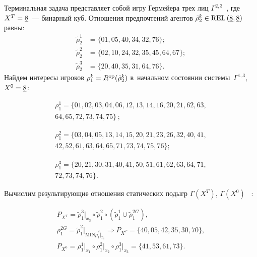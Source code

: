 \begin{multicols}{2}
    \vspace*{-3pt}
    
    \noindent
Терминальная задача представляет собой игру Гермейера трех лиц 
$\Gamma^{2,3}$~\cite{1-vas, 5-vas}, где $X^T\hm=\underline{8}$~--- бинарный куб. 
Отношения предпочтений агентов $\tilde{\rho}_2^k \hm\in \mathrm{REL}\,(\underline{8},\underline{8})$ равны:
\begin{align*}
\tilde{\rho}_2^1 &=\{ 01, 05, 40, 34, 32, 76\};\\
\tilde{\rho}_2^2&= \{ 02, 10, 24, 32, 35, 45, 64, 67\};\\
\tilde{\rho}_2^3 &=\{ 20, 40, 35, 31, 64, 76\}.
\end{align*}
Найдем интересы игроков $\rho_1^k\hm= R^{\mathrm{op}}(\tilde{\rho}_2^k)$ в~начальном 
состоянии сис\-те\-мы~$\Gamma^{1,3}$, $X^0\hm= \underline{8}$: 

\vspace*{-4pt}

\noindent
\begin{multline*}
\rho_1^1= \{ 01, 02, 03, 04, 06, 12, 13, 14, 16, 20, 21, 62, 63,\\
 64, 65, 72, 73, 74, 75\}\,;
 \end{multline*}
 
 \vspace*{-14pt}
 
 \noindent
 \begin{multline*}
 \rho_1^2=\{ 03, 04, 05, 13, 14, 15, 20, 21,23, 26, 32, 40, 41,\\
  42, 52, 61, 63, 64, 65, 71, 73, 74, 75, 76\};
  \end{multline*}
  
  \vspace*{-14pt}
 
 \noindent
 \begin{multline*}
\rho_1^3 = \{ 20, 21, 30, 31, 40, 41, 50, 51, 61, 62, 63, 64, 71,\\
 72, 73, 74, 76\}.
\end{multline*}

\vspace*{-5pt}

\noindent
Вычислим результирующие отношения статических подыгр $\Gamma(X^T)$, 
$\Gamma(X^0)$ ~\cite{5-vas}:

\vspace*{-4pt}

\noindent
\begin{multline*}
P_{X^T} =\tilde{\rho}_1^3 \vert_{x_3} \circ \tilde{\rho}_1^2 \circ \left( \tilde{\rho}_1^1 
\cup \tilde{\rho}_1^{2G}\right),\\
\rho_{1}^{2G} =\tilde{\rho}_1^2 \vert_{\mathrm{MIN} \tilde{\rho}_1^2\vert_{{x_1}}}
\Rightarrow P_{X^T} =\{ 40, 05, 42, 35, 30, 70\},\\
P_{X^0} =\rho_1^1\vert_{x_1} \circ \rho_1^2\vert_{x_2}\circ\rho_1^3\vert_{x_3} =\{ 41, 53, 61, 73\}.
\end{multline*}


\end{multicols}
